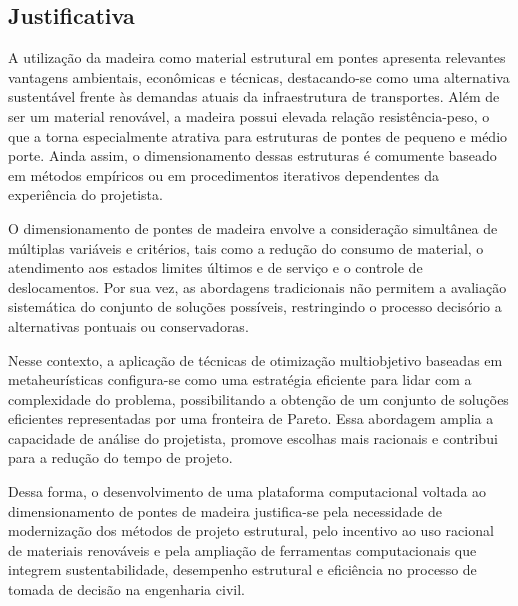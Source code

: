 \subsection{Justificativa}

A utilização da madeira como material estrutural em pontes apresenta relevantes vantagens ambientais, econômicas e técnicas, destacando-se como uma alternativa sustentável frente às demandas atuais da infraestrutura de transportes. Além de ser um material renovável, a madeira possui elevada relação resistência-peso, o que a torna especialmente atrativa para estruturas de pontes de pequeno e médio porte. Ainda assim, o dimensionamento dessas estruturas é comumente baseado em métodos empíricos ou em procedimentos iterativos dependentes da experiência do projetista.

O dimensionamento de pontes de madeira envolve a consideração simultânea de múltiplas variáveis e critérios, tais como a redução do consumo de material, o atendimento aos estados limites últimos e de serviço e o controle de deslocamentos. Por sua vez, as abordagens tradicionais não permitem a avaliação sistemática do conjunto de soluções possíveis, restringindo o processo decisório a alternativas pontuais ou conservadoras.

Nesse contexto, a aplicação de técnicas de otimização multiobjetivo baseadas em metaheurísticas configura-se como uma estratégia eficiente para lidar com a complexidade do problema, possibilitando a obtenção de um conjunto de soluções eficientes representadas por uma fronteira de Pareto. Essa abordagem amplia a capacidade de análise do projetista, promove escolhas mais racionais e contribui para a redução do tempo de projeto.

Dessa forma, o desenvolvimento de uma plataforma computacional voltada ao dimensionamento de pontes de madeira justifica-se pela necessidade de modernização dos métodos de projeto estrutural, pelo incentivo ao uso racional de materiais renováveis e pela ampliação de ferramentas computacionais que integrem sustentabilidade, desempenho estrutural e eficiência no processo de tomada de decisão na engenharia civil.


